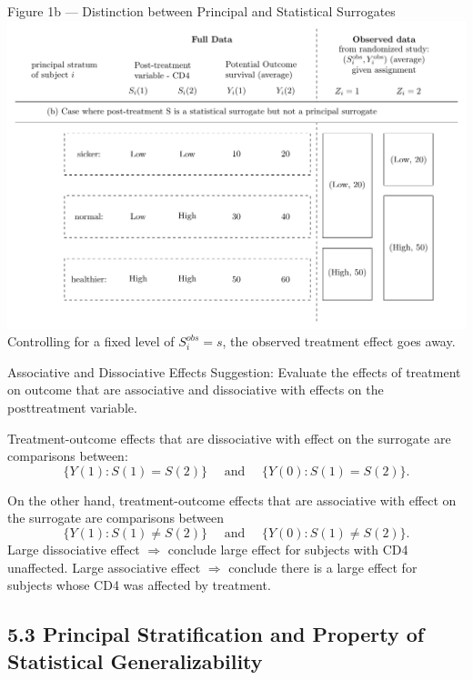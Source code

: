 \documentclass[10pt]{beamer}
\begin{document}
\begin{frame}{\normalsize Figure 1b — Distinction between Principal and Statistical Surrogates}
\includegraphics[width=\linewidth]{figures/figure2/frangakis_rubin_figure2.pdf}
{\footnotesize
Controlling for a fixed level of $S_i^{obs} = s$, the observed treatment effect goes away. 
}
\end{frame}

\begin{frame}{Associative and Dissociative Effects}
Suggestion: Evaluate the effects of treatment on outcome that are 
associative and dissociative with effects on the posttreatment
variable. 

Treatment-outcome effects that are dissociative with effect on the surrogate are
comparisons between: 
$$\{ Y(1) : S(1) = S(2) \} \quad \text{ and } \quad \{ Y(0) : S(1) = S(2) \}.$$

On the other hand, treatment-outcome effects that are associative with effect
on the surrogate are comparisons between 
$$\{ Y(1) : S(1) \neq S(2) \} \quad \text{ and } \quad \{ Y(0) : S(1) \neq S(2) \}.$$
\footnotesize Large dissociative effect $\Rightarrow$ conclude large effect for 
subjects with CD4 unaffected. \newline 
\footnotesize Large associative effect $\Rightarrow$ conclude there is a 
large effect for subjects whose CD4 was affected by treatment.
\end{frame}


\subsection{5.3 Principal Stratification and Property of Statistical Generalizability}
\end{document}
